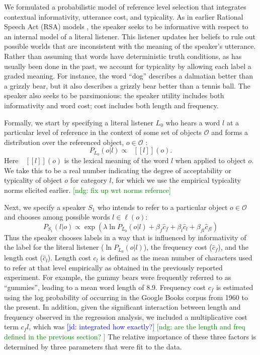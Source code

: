 \documentclass[10pt,letterpaper]{article}
\newcommand{\ndg}[1]{\textcolor{Green}{[ndg: #1]}}
\newcommand{\jd}[1]{\textcolor{Blue}{[jd: #1]}}
\newcommand{\denote}[1]{\mbox{ $[\![ #1 ]\!]$}}
\begin{document}
We formulated a probabilistic model of reference level selection that integrates contextual informativity, utterance cost, and typicality.
As in earlier Rational Speech Act (RSA) models \cite{frank2012, goodmanstuhlmueller2013}, the speaker seeks to be informative with respect to an internal model of a literal listener. This listener updates her beliefs to rule out possible worlds that are inconsistent with the meaning of the speaker's utterance. Rather than assuming that words have deterministic truth conditions, as has usually been done in the past, we account for typicality by allowing each label a graded meaning. For instance, the word ``dog'' describes a dalmatian better than a grizzly bear, but it also describes a grizzly bear better than a tennis ball.
The speaker also seeks to be parsimonious: the speaker utility includes both informativity and word cost; cost includes both length and frequency.

Formally, we start by specifying a literal listener $L_0$ who hears a word $l$ at a particular level of reference  in the context of some set of objects $\mathcal{O}$ and forms a distribution over the referenced object, $o \in \mathcal{O}$ : 
$$P_{L_0}(o | l) \propto \denote{l}(o).$$
Here $\denote{l}(o)$ is the lexical meaning of the word $l$ when applied to object $o$. We take this to be a real number indicating the degree of acceptability or typicality of object $o$ for category $l$, for which we use the empirical typicality norms elicited earlier. \ndg{fix up wrt norms refernce}

Next, we specify a speaker $S_1$ who intends to refer to a particular object $o \in \mathcal{O}$ and chooses among possible words $l \in \ell(o)$: 
$$P_{S_1}(l | o) \propto \exp(\lambda \ln P_{L_0}(o | l) + \beta_f \hat{c}_f  + \beta_l \hat{c}_l + \beta_{fl} \hat{c}_{fl} )$$
Thus the speaker chooses labels in a way that is influenced by informativity of the label for the literal listener ($\ln P_{L_0}(o | l)$), the frequency cost ($\hat{c}_f$), and the length cost ($\hat{c}_l$).
Length cost $c_l$ is defined as the mean number of characters used to refer at that level empirically as obtained in the previously reported experiment. For example, the gummy bears were frequently referred to as ``gummies'', leading to a mean word length of 8.9. Frequency cost $c_f$ is estimated using the log probability of occurring in the Google Books corpus from 1960 to the present. In addition, given the significant interaction between length and frequency observed in the regression analysis, we included a multiplicative cost term $c_fl$, which was \jd{integrated how exactly?} \ndg{are the length and freq defined in the previous section? }
The relative importance of these three factors is determined by three parameters that were fit to the data.
\end{document}
